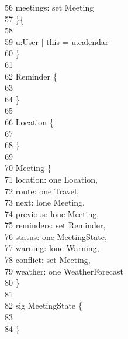 \-    \ 56      \qquad \-\qquad meetings: {\color{blue}set} Meeting\\
\-    \ 57      \qquad \}\{\\
\-    \ 58      \qquad \-\\
\-    \ 59      \qquad \- u:User | this = u.calendar\\
\-    \ 60      \qquad \}\\
\-    \ 61      \qquad \\
\-    \ 62       Reminder \{\\
\-    \ 63      \qquad \\
\-    \ 64      \qquad \}\\
\-    \ 65      \qquad \\
\-    \ 66       Location \{\\
\-    \ 67      \qquad \\
\-    \ 68      \qquad \}\\
\-    \ 69      \qquad \\
\-    \ 70       Meeting \{\\
\-    \ 71      \qquad \-\qquad location: {\color{blue}one} Location,\\
\-    \ 72      \qquad \-\qquad route: {\color{blue}one} Travel,\\
\-    \ 73      \qquad \-\qquad next: {\color{blue}lone} Meeting,\\
\-    \ 74      \qquad \-\qquad previous: {\color{blue}lone} Meeting,\\
\-    \ 75      \qquad \-\qquad reminders: {\color{blue}set} Reminder,\\
\-    \ 76      \qquad \-\qquad status: {\color{blue}one} MeetingState,\\
\-    \ 77      \qquad \-\qquad warning: {\color{blue}lone} Warning,\\
\-    \ 78      \qquad \-\qquad conflict: {\color{blue}set} Meeting,\\
\-    \ 79      \qquad \-\qquad weather: {\color{blue}one} WeatherForecast\\
\-    \ 80      \qquad \} \\
\-    \ 81      \qquad \\
\-    \ 82       {\color{blue}sig} MeetingState \{\\
\-    \ 83      \qquad  \\
\-    \ 84      \qquad \}\\
